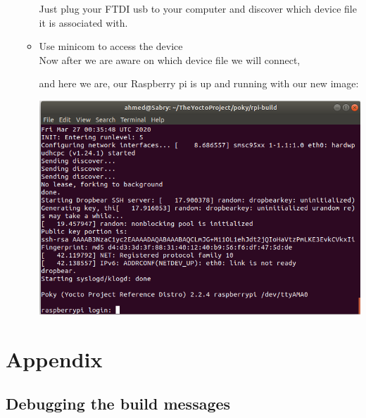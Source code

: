 \documentclass{article}
\begin{document}
\begin{enumerate}
\begin{itemize}
        Just plug your FTDI usb to your computer and discover which device file it is associated with.
        

        \item Use minicom to access the device\\
        Now after we are aware on which device file we will connect, 
        

        and here we are, our Raspberry pi is up and running with our new image:
        \begin{center}
          \includegraphics[scale=0.60]{./resources/img/boot-pi.png}
        \end{center}

      
      \end{itemize}
\end{enumerate}


\section{Appendix}
\subsection{Debugging the build messages}
\end{document}
